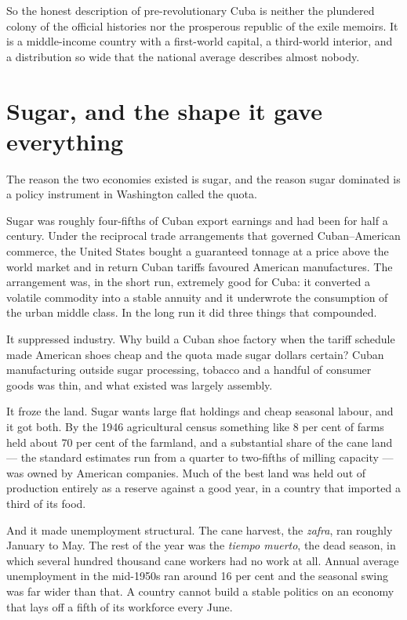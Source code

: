 So the honest description of pre-revolutionary Cuba is neither the plundered
colony of the official histories nor the prosperous republic of the exile
memoirs. It is a middle-income country with a first-world capital, a
third-world interior, and a distribution so wide that the national average
describes almost nobody.

\section{Sugar, and the shape it gave everything}

The reason the two economies existed is sugar, and the reason sugar dominated
is a policy instrument in Washington called the quota.

Sugar was roughly four-fifths of Cuban export earnings and had been for
half a century.\unv{} Under the reciprocal trade arrangements that governed
Cuban--American commerce, the United States bought a guaranteed tonnage at a
price above the world market and in return Cuban tariffs favoured American
manufactures. The arrangement was, in the short run, extremely good for Cuba:
it converted a volatile commodity into a stable annuity and it underwrote the
consumption of the urban middle class. In the long run it did three things that
compounded.

It suppressed industry. Why build a Cuban shoe factory when the tariff schedule
made American shoes cheap and the quota made sugar dollars certain? Cuban
manufacturing outside sugar processing, tobacco and a handful of consumer goods
was thin, and what existed was largely assembly.

It froze the land. Sugar wants large flat holdings and cheap seasonal labour,
and it got both. By the 1946 agricultural census something like 8 per cent of
farms held about 70 per cent of the farmland, and a substantial share of the
cane land --- the standard estimates run from a quarter to two-fifths of milling
capacity --- was owned by American companies.\unv{} Much of the best land was
held out of production entirely as a reserve against a good year, in a country
that imported a third of its food.

And it made unemployment structural. The cane harvest, the \emph{zafra}, ran
roughly January to May. The rest of the year was the \emph{tiempo muerto}, the
dead season, in which several hundred thousand cane workers had no work at all.
Annual average unemployment in the mid-1950s ran around 16 per cent and the
seasonal swing was far wider than that.\unv{} A country cannot build a stable
politics on an economy that lays off a fifth of its workforce every June.

